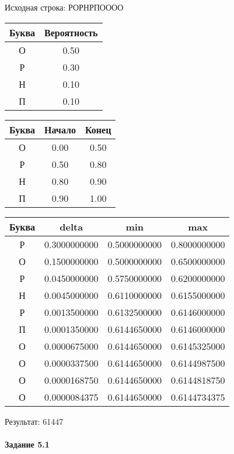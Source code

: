 \documentclass[a4paper, 12pt]{article}
\begin{document}
Исходная строка: РОРНРПОООО\
\begin{center}
 \begin{tabular}{ |c|c| } 
  \hline
     Буква & Вероятность \\ \hline
О & 0.50\\\hline
Р & 0.30\\\hline
Н & 0.10\\\hline
П & 0.10
\\ \hline \end{tabular}
\end{center}
\begin{center}
 \begin{tabular}{ |c|c|c| } 
  \hline
     Буква & Начало & Конец \\ \hline
О & 0.00 & 0.50\\\hline
Р & 0.50 & 0.80\\\hline
Н & 0.80 & 0.90\\\hline
П & 0.90 & 1.00
\\ \hline \end{tabular}
\end{center}
\begin{center}
 \begin{tabular}{ |c|c|c|c| } 
  \hline
     Буква & delta & min & max \\ \hline
Р & 0.3000000000 & 0.5000000000 & 0.8000000000\\\hline
О & 0.1500000000 & 0.5000000000 & 0.6500000000\\\hline
Р & 0.0450000000 & 0.5750000000 & 0.6200000000\\\hline
Н & 0.0045000000 & 0.6110000000 & 0.6155000000\\\hline
Р & 0.0013500000 & 0.6132500000 & 0.6146000000\\\hline
П & 0.0001350000 & 0.6144650000 & 0.6146000000\\\hline
О & 0.0000675000 & 0.6144650000 & 0.6145325000\\\hline
О & 0.0000337500 & 0.6144650000 & 0.6144987500\\\hline
О & 0.0000168750 & 0.6144650000 & 0.6144818750\\\hline
О & 0.0000084375 & 0.6144650000 & 0.6144734375
\\ \hline \end{tabular}
\end{center}
Результат: 61447
\pagebreak
\paragraph{Задание 5.1}
\end{document}
